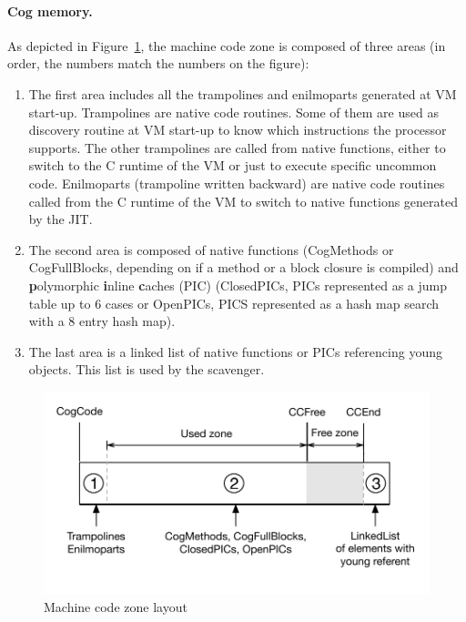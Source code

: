 \documentclass[10pt,preprint,nonatbib]{sigplanconf}
\newcommand{\figref}[1]{Figure~\ref{fig:#1}}
\begin{document}
\paragraph{Cog memory.} As depicted in \figref{CogMemory}, the machine code zone is composed of three areas (in order, the numbers match the numbers on the figure):
\begin{enumerate}
	\item The first area includes all the trampolines and enilmoparts generated at VM start-up. Trampolines are native code routines. Some of them are used as discovery routine at VM start-up to know which instructions the processor supports. The other trampolines are called from native functions, either to switch to the C runtime of the VM or just to execute specific uncommon code. Enilmoparts (trampoline written backward) are native code routines called from the C runtime of the VM to switch to native functions generated by the JIT. 
	\item The second area is composed of native functions (CogMethods or CogFullBlocks, depending on if a method or a block closure is compiled) and \textbf{p}olymorphic \textbf{i}nline \textbf{c}aches (PIC) (ClosedPICs, PICs represented as a jump table up to 6 cases or OpenPICs, PICS represented as a hash map search with a 8 entry hash map).~\cite{Holz91a}
	\item The last area is a linked list of native functions or PICs referencing young objects. This list is used by the scavenger.
\end{enumerate}

\begin{figure}[htp!]
     \begin{center}
         \includegraphics[width=\linewidth]{CogMemory}
         \caption{Machine code zone layout}
         \label{fig:CogMemory}
     \end{center}
 \end{figure}
\end{document}
